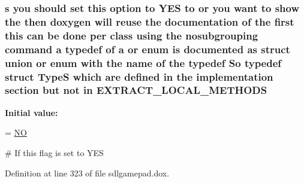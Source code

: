 \hypertarget{sdlgamepad_8dox_a7274082691ced043d976dbd8b0e8c608}{
\subsubsection[{E\-X\-T\-R\-A\-C\-T\-\_\-\-L\-O\-C\-A\-L\-\_\-\-M\-E\-T\-H\-O\-D\-S}]{ {\bf s} you should {\bf set} this option to Y\-E\-S to or you want to show the then doxygen will reuse the documentation of the {\bf first} this can be {\bf done} per class using the nosubgrouping command {\bf a} typedef of {\bf a} or enum is documented as {\bf struct} {\bf union} or enum with the {\bf name} of the typedef So typedef {\bf struct} {\bf Type\-S} which {\bf are} defined {\bf in} the implementation section but {\bf not} {\bf in} E\-X\-T\-R\-A\-C\-T\-\_\-\-L\-O\-C\-A\-L\-\_\-\-M\-E\-T\-H\-O\-D\-S}}\label{sdlgamepad_8dox_a7274082691ced043d976dbd8b0e8c608}
{\bfseries Initial value\-:}
\begin{DoxyCode}
= \hyperlink{sdlgamepad_8dox_a0f6a46245280dc38baf9600906aa1393}{NO}

\textcolor{preprocessor}{# If this flag is set to YES}
\end{DoxyCode}


Definition at line 323 of file sdlgamepad.\-dox.

